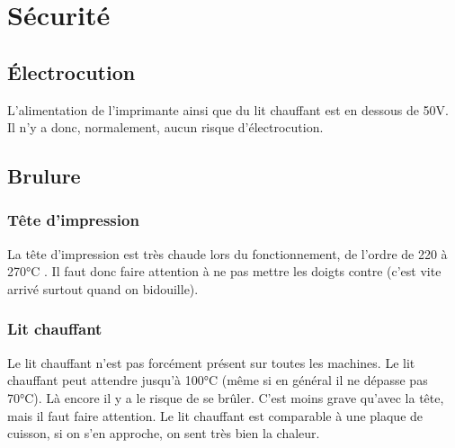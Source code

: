 
\section{Sécurité}

\subsection{Électrocution}

L’alimentation de l’imprimante ainsi que du lit chauffant est en dessous de 50V. Il n’y a donc, normalement, aucun risque d’électrocution.

\subsection{Brulure}

\subsubsection{Tête d'impression}

La tête d’impression est très chaude lors du fonctionnement, de l’ordre de 220 à 270°C . Il faut donc faire attention à ne pas mettre les doigts contre (c'est vite arrivé surtout quand on bidouille).

\subsubsection{Lit chauffant}

Le lit chauffant n'est pas forcément présent sur toutes les machines. Le lit chauffant peut attendre jusqu'à 100°C (même si en général il ne dépasse pas 70°C). Là encore il y a le risque de se brûler. C'est moins grave qu'avec la tête, mais il faut faire attention. Le lit chauffant est comparable à une plaque de cuisson, si on s'en approche, on sent très bien la chaleur.
